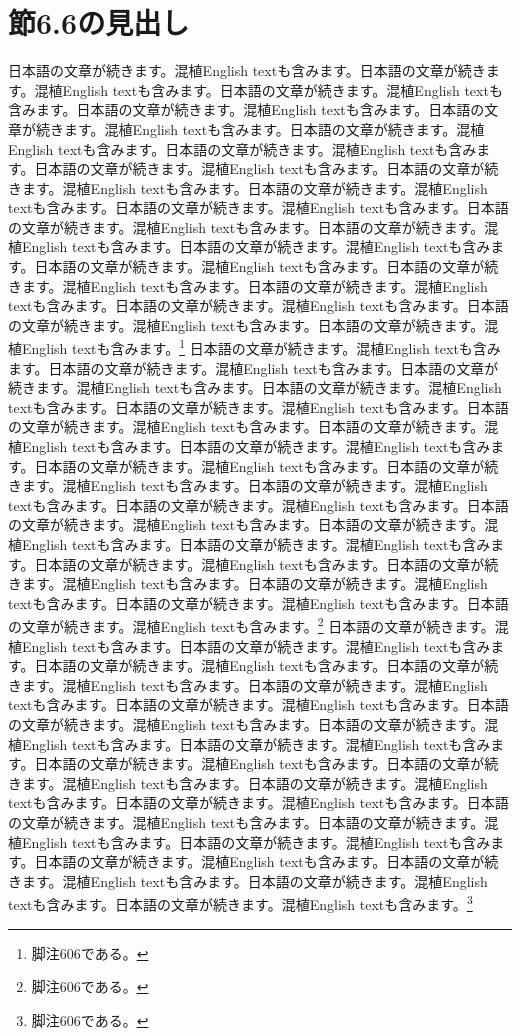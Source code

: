 \documentclass[pdflatex,book]{jlreq}
\begin{document}
\section{節6.6の見出し}
日本語の文章が続きます。混植English textも含みます。日本語の文章が続きます。混植English textも含みます。日本語の文章が続きます。混植English textも含みます。日本語の文章が続きます。混植English textも含みます。日本語の文章が続きます。混植English textも含みます。日本語の文章が続きます。混植English textも含みます。日本語の文章が続きます。混植English textも含みます。日本語の文章が続きます。混植English textも含みます。日本語の文章が続きます。混植English textも含みます。日本語の文章が続きます。混植English textも含みます。日本語の文章が続きます。混植English textも含みます。日本語の文章が続きます。混植English textも含みます。日本語の文章が続きます。混植English textも含みます。日本語の文章が続きます。混植English textも含みます。日本語の文章が続きます。混植English textも含みます。日本語の文章が続きます。混植English textも含みます。日本語の文章が続きます。混植English textも含みます。日本語の文章が続きます。混植English textも含みます。日本語の文章が続きます。混植English textも含みます。日本語の文章が続きます。混植English textも含みます。\footnote{脚注606である。}
日本語の文章が続きます。混植English textも含みます。日本語の文章が続きます。混植English textも含みます。日本語の文章が続きます。混植English textも含みます。日本語の文章が続きます。混植English textも含みます。日本語の文章が続きます。混植English textも含みます。日本語の文章が続きます。混植English textも含みます。日本語の文章が続きます。混植English textも含みます。日本語の文章が続きます。混植English textも含みます。日本語の文章が続きます。混植English textも含みます。日本語の文章が続きます。混植English textも含みます。日本語の文章が続きます。混植English textも含みます。日本語の文章が続きます。混植English textも含みます。日本語の文章が続きます。混植English textも含みます。日本語の文章が続きます。混植English textも含みます。日本語の文章が続きます。混植English textも含みます。日本語の文章が続きます。混植English textも含みます。日本語の文章が続きます。混植English textも含みます。日本語の文章が続きます。混植English textも含みます。日本語の文章が続きます。混植English textも含みます。日本語の文章が続きます。混植English textも含みます。\footnote{脚注606である。}
日本語の文章が続きます。混植English textも含みます。日本語の文章が続きます。混植English textも含みます。日本語の文章が続きます。混植English textも含みます。日本語の文章が続きます。混植English textも含みます。日本語の文章が続きます。混植English textも含みます。日本語の文章が続きます。混植English textも含みます。日本語の文章が続きます。混植English textも含みます。日本語の文章が続きます。混植English textも含みます。日本語の文章が続きます。混植English textも含みます。日本語の文章が続きます。混植English textも含みます。日本語の文章が続きます。混植English textも含みます。日本語の文章が続きます。混植English textも含みます。日本語の文章が続きます。混植English textも含みます。日本語の文章が続きます。混植English textも含みます。日本語の文章が続きます。混植English textも含みます。日本語の文章が続きます。混植English textも含みます。日本語の文章が続きます。混植English textも含みます。日本語の文章が続きます。混植English textも含みます。日本語の文章が続きます。混植English textも含みます。日本語の文章が続きます。混植English textも含みます。\footnote{脚注606である。}
\end{document}
